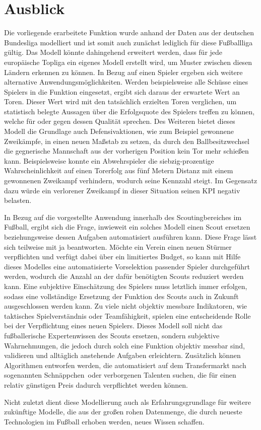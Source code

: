 \section{Ausblick}
\label{ausblick}

Die vorliegende erarbeitete Funktion wurde anhand der Daten aus der deutschen Bundesliga modelliert und ist somit auch zunächst lediglich für diese Fußballliga gültig. Das Modell könnte dahingehend erweitert werden, dass für jede europäische Topliga ein eigenes Modell erstellt wird, um Muster zwischen diesen Ländern erkennen zu können. In Bezug auf einen Spieler ergeben sich weitere alternative Anwendungsmöglichkeiten. Werden beispielsweise alle Schüsse eines Spielers in die Funktion eingesetzt, ergibt sich daraus der erwartete Wert an Toren. Dieser Wert wird mit den tatsächlich erzielten Toren verglichen, um statistisch belegte Aussagen über die Erfolgsquote des Spielers treffen zu können, welche für oder gegen dessen Qualität sprechen. Des Weiteren bietet dieses Modell die Grundlage auch Defensivaktionen, wie zum Beispiel gewonnene Zweikämpfe, in einen neuen Maßstab zu setzen, da durch den Ballbesitzwechsel die gegnerische Mannschaft aus der vorherigen Position kein Tor mehr schießen kann. Beispielsweise konnte ein Abwehrspieler die siebzig-prozentige Wahrscheinlichkeit auf einen Torerfolg aus fünf Metern Distanz mit einem gewonnenen Zweikampf verhindern, wodurch seine Kennzahl steigt. Im Gegensatz dazu würde ein verlorener Zweikampf in dieser Situation seinen KPI negativ belasten.

In Bezug auf die vorgestellte Anwendung innerhalb des Scoutingbereiches im Fußball, ergibt sich die Frage, inwieweit ein solches Modell einen Scout ersetzen beziehungsweise dessen Aufgaben automatisiert ausführen kann. Diese Frage lässt sich teilweise mit ja beantworten. Möchte ein Verein einen neuen Stürmer verpflichten und verfügt dabei über ein limitiertes Budget, so kann mit Hilfe dieses Modelles eine automatisierte Vorselektion passender Spieler durchgeführt werden, wodurch die Anzahl an der dafür benötigten Scouts reduziert werden kann. Eine subjektive Einschätzung des Spielers muss letztlich immer erfolgen, sodass eine vollständige Ersetzung der Funktion des Scouts auch in Zukunft ausgeschlossen werden kann. Zu viele nicht objektiv messbare Indikatoren, wie taktisches Spielverständnis oder Teamfähigkeit, spielen eine entscheidende Rolle bei der Verpflichtung eines neuen Spielers. Dieses Modell soll nicht das fußballerische Expertenwissen des Scouts ersetzen, sondern subjektive Wahrnehmungen, die jedoch durch solch eine Funktion objektiv messbar sind, validieren und alltäglich anstehende Aufgaben erleichtern. Zusätzlich können Algorithmen entworfen werden, die automatisiert auf dem Transfermarkt nach sogenannten \glqq Schnäppchen\grqq~oder verborgenen Talenten suchen, die für einen relativ günstigen Preis dadurch verpflichtet werden können. 

Nicht zuletzt dient diese Modellierung auch als Erfahrungsgrundlage für weitere zukünftige Modelle, die aus der großen rohen Datenmenge, die durch neueste Technologien im Fußball erhoben werden, neues Wissen schaffen.